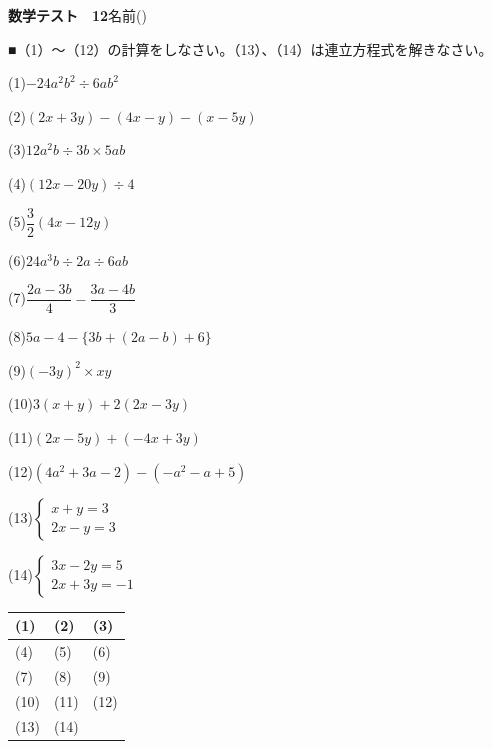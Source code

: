 \documentclass[a4paper,11pt]{ltjsarticle}
\newlength{\qcol}\setlength{\qcol}{0.47\textwidth}
\newlength{\qgap}
\newlength{\anscolw}\setlength{\anscolw}{0.30\textwidth}
\newlength{\ansh}
\newcommand{\Q}[2]{\parbox[t]{\qcol}{\raggedright (#1)\hspace{0.6em}$\displaystyle #2$}}
\newcommand{\QR}[4]{\Q{#1}{#2}\hfill\Q{#3}{#4}\par\vspace{\qgap}}
\newcommand{\anscell}[1]{\rule[-\ansdrop]{0pt}{\ansh}(#1)}
\newlength{\ansdrop}
\begin{document}
{\large\bfseries 数学テスト　12}\hfill 名前(\underline{\hspace{32mm}})\par\vspace{3mm}
■（1）〜（12）の計算をしなさい。（13）、（14）は連立方程式を解きなさい。\par\vspace{3mm}
\setlength{\qgap}{11mm}
\QR{1}{-24a^2b^2\div6ab^2}{2}{(2x+3y)-(4x-y)-(x-5y)}
\QR{3}{12a^2b\div3b\times5ab}{4}{(12x-20y)\div4}
\QR{5}{\dfrac{3}{2}(4x-12y)}{6}{24a^3b\div2a\div6ab}
\QR{7}{\dfrac{2a-3b}{4}-\dfrac{3a-4b}{3}}{8}{5a-4-\{3b+(2a-b)+6\}}
\QR{9}{(-3y)^2\times xy}{10}{3(x+y)+2(2x-3y)}
\QR{11}{(2x-5y)+(-4x+3y)}{12}{(4a^2+3a-2)-(-a^2-a+5)}
\QR{13}{\left\{\begin{array}{l} x+y=3 \\ 2x-y=3 \end{array}\right.}{14}{\left\{\begin{array}{l} 3x-2y=5 \\ 2x+3y=-1 \end{array}\right.}
\vfill
\setlength{\ansh}{12mm}\setlength{\ansdrop}{8mm}%
\begin{center}\begin{tabular}{|p{\anscolw}|p{\anscolw}|p{\anscolw}|}\hline
\anscell{1} & \anscell{2} & \anscell{3} \\\hline
\anscell{4} & \anscell{5} & \anscell{6} \\\hline
\anscell{7} & \anscell{8} & \anscell{9} \\\hline
\anscell{10} & \anscell{11} & \anscell{12} \\\hline
\anscell{13} & \anscell{14} &  \\\hline
\end{tabular}\end{center}
\end{document}
